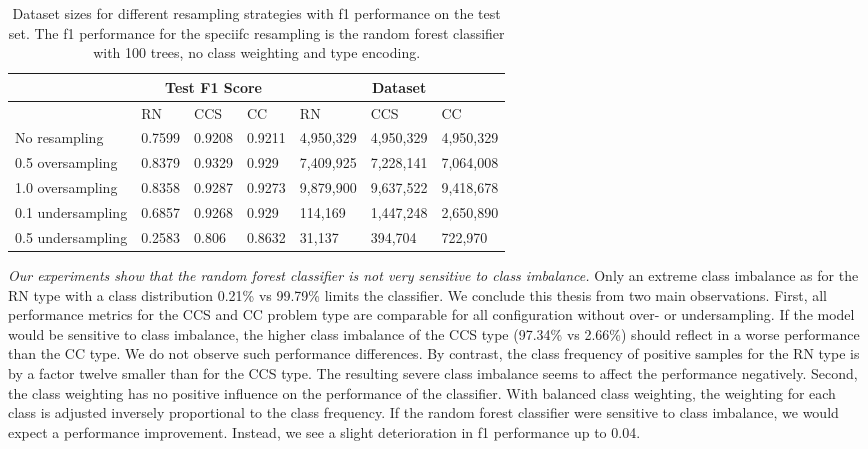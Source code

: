 \begin{table}[]
\tabcolsep=0.11cm
\begin{tabularx}{\textwidth}{lXXX|XXX}
\toprule
                    & \multicolumn{3}{c}{Test F1 Score} & \multicolumn{3}{c}{Dataset}   \\ \midrule
                    & RN        & CCS        & CC     & RN            & CCS         & CC          \\ \midrule
No resampling     &  0.7599   &  0.9208    &  0.9211  &  4,950,329    & 4,950,329   & 4,950,329   \\
0.5 oversampling  &  0.8379   &  0.9329    &  0.929   &  7,409,925    & 7,228,141   & 7,064,008   \\
1.0 oversampling  &  0.8358   &  0.9287    &  0.9273  &  9,879,900    & 9,637,522   & 9,418,678   \\ \midrule
0.1 undersampling &  0.6857   &  0.9268    &  0.929   &  114,169      & 1,447,248   & 2,650,890   \\
0.5 undersampling &  0.2583   &  0.806     &  0.8632  &  31,137       & 394,704     & 722,970     \\ \bottomrule
\end{tabularx}
\caption{Dataset sizes for different resampling strategies with f1 performance on the test set. The f1 performance for the speciifc resampling is the random forest classifier with 100 trees, no class weighting and type encoding.}
\label{tab:resampling_size_performance_rf}
\end{table}

\textit{Our experiments show that the random forest classifier is not very sensitive to class imbalance.} Only an extreme class imbalance as for the RN type with a class distribution 0.21\% vs 99.79\% limits the classifier. We conclude this thesis from two main observations. 
First, all performance metrics for the CCS and CC problem type are comparable for all configuration without over- or undersampling. If the model would be sensitive to class imbalance, the higher class imbalance of the CCS type (97.34\% vs 2.66\%) should reflect in a worse performance than the CC type. We do not observe such performance differences. By contrast, the class frequency of positive samples for the RN type is by a factor twelve smaller than for the CCS type. The resulting severe class imbalance seems to affect the performance negatively. 
Second, the class weighting has no positive influence on the performance of the classifier. With balanced class weighting, the weighting for each class is adjusted inversely proportional to the class frequency. If the random forest classifier were sensitive to class imbalance, we would expect a performance improvement. Instead, we see a slight deterioration in f1 performance up to 0.04.



